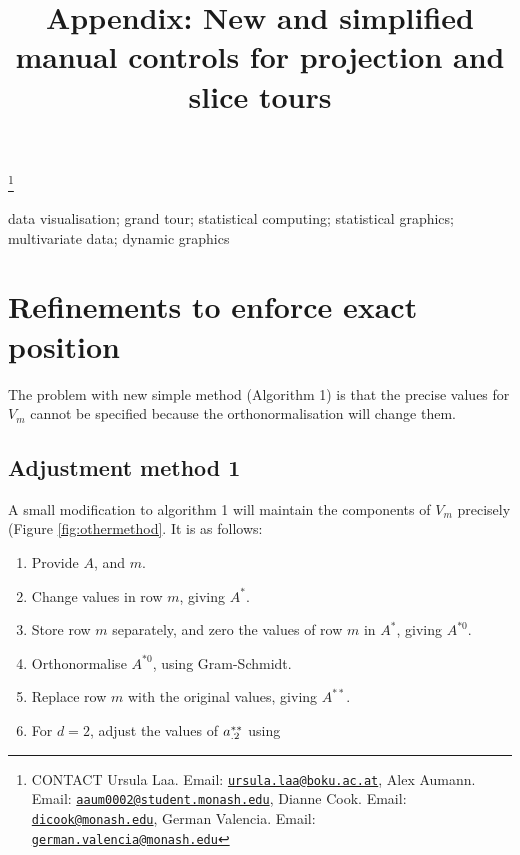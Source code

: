\documentclass[]{interact}
\theoremstyle{plain}%
\theoremstyle{definition}
\theoremstyle{remark}
\providecommand{\tightlist}{%
  \setlength{\itemsep}{0pt}\setlength{\parskip}{0pt}}
\def\tightlist{}
\begin{document}

\title{Appendix: New and simplified manual controls for projection and
slice tours}


\author{
}

\thanks{CONTACT Ursula
Laa. Email: \href{mailto:ursula.laa@boku.ac.at}{\nolinkurl{ursula.laa@boku.ac.at}}, Alex
Aumann. Email: \href{mailto:aaum0002@student.monash.edu}{\nolinkurl{aaum0002@student.monash.edu}}, Dianne
Cook. Email: \href{mailto:dicook@monash.edu}{\nolinkurl{dicook@monash.edu}}, German
Valencia. Email: \href{mailto:german.valencia@monash.edu}{\nolinkurl{german.valencia@monash.edu}}}

\maketitle


\begin{keywords}
data visualisation; grand tour; statistical computing; statistical
graphics; multivariate data; dynamic graphics
\end{keywords}

\hypertarget{refinements-to-enforce-exact-position}{%
\section{Refinements to enforce exact
position}\label{refinements-to-enforce-exact-position}}

The problem with new simple method (Algorithm 1) is that the precise
values for \(V_m\) cannot be specified because the orthonormalisation
will change them.

\hypertarget{adjustment-method-1}{%
\subsection{Adjustment method 1}\label{adjustment-method-1}}

A small modification to algorithm 1 will maintain the components of
\(V_m\) precisely (Figure \ref{fig:othermethod}. It is as follows:

\begin{enumerate}
\def\labelenumi{\arabic{enumi}.}
\tightlist
\item
  Provide \(A\), and \(m\).
\item
  Change values in row \(m\), giving \(A^*\).
\item
  Store row \(m\) separately, and zero the values of row \(m\) in
  \(A^*\), giving \(A^{*0}\).
\item
  Orthonormalise \(A^{*0}\), using Gram-Schmidt.
\item
  Replace row \(m\) with the original values, giving \(A^{**}\).
\item
  For \(d=2\), adjust the values of \({\boldmath a}^{**}_{.2}\) using
\end{enumerate}
\end{document}
